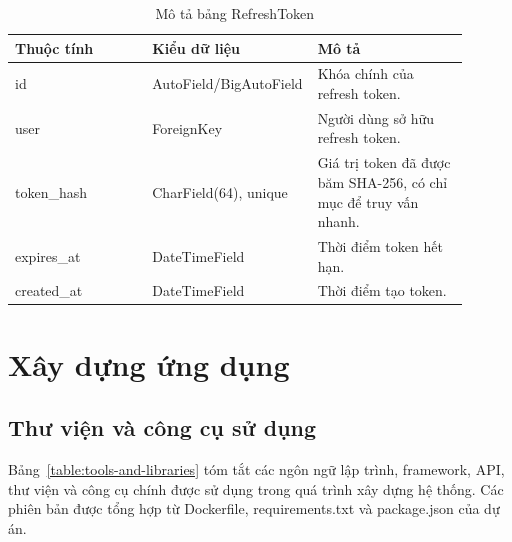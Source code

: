 ﻿\documentclass[../DoAn.tex]{subfiles}
\begin{document}
\begin{table}[H]
\centering
\caption{Mô tả bảng RefreshToken}
\label{table:db-refresh-token}
\small
\setlength{\tabcolsep}{4pt}
\renewcommand{\arraystretch}{1.18}
\begin{tabular}{|p{0.30\linewidth}|p{0.27\linewidth}|p{0.33\linewidth}|}
\hline
\textbf{Thuộc tính} & \textbf{Kiểu dữ liệu} & \textbf{Mô tả} \\ \hline
id & AutoField/BigAutoField & Khóa chính của refresh token. \\ \hline
user & ForeignKey & Người dùng sở hữu refresh token. \\ \hline
token\_\allowbreak hash & CharField(64), unique & Giá trị token đã được băm SHA-256, có chỉ mục để truy vấn nhanh. \\ \hline
expires\_\allowbreak at & DateTimeField & Thời điểm token hết hạn. \\ \hline
created\_\allowbreak at & DateTimeField & Thời điểm tạo token. \\ \hline
\end{tabular}
\end{table}

\section{Xây dựng ứng dụng}
\subsection{Thư viện và công cụ sử dụng}
Bảng~\ref{table:tools-and-libraries} tóm tắt các ngôn ngữ lập trình, framework, API, thư viện và công cụ chính được sử dụng trong quá trình xây dựng hệ thống. Các phiên bản được tổng hợp từ Dockerfile, requirements.txt và package.json của dự án.
\end{document}
